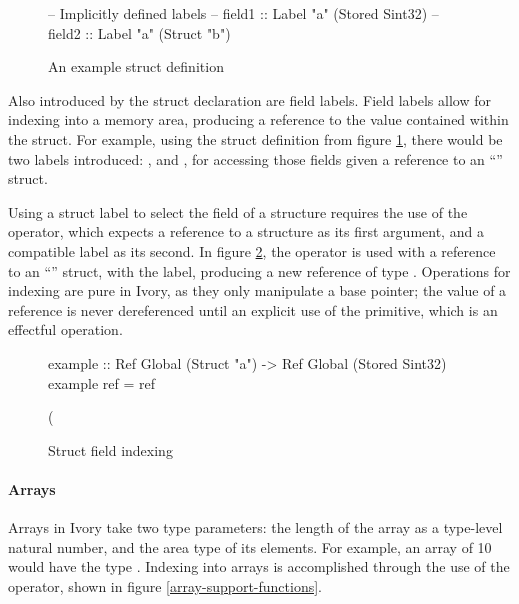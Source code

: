 \begin{figure}[h]
\begin{code}

-- Implicitly defined labels
-- field1 :: Label "a" (Stored Sint32)
-- field2 :: Label "a" (Struct "b")
\end{code}
\caption{An example struct definition}
\label{example-struct}
\end{figure}

Also introduced by the struct declaration are field labels.  Field labels allow
for indexing into a memory area, producing a reference to the value contained
within the struct.  For example, using the struct definition from figure
\ref{example-struct}, there would be two labels introduced: , and
, for accessing those fields given a reference to an ``''
struct.

Using a struct label to select the field of a structure requires the use of the
\cd{(\mytilde>)} operator, which expects a reference to a structure as its first
argument, and a compatible label as its second.  In figure
\ref{example-struct-label}, the \cd{(\mytilde>)} operator is used with a
reference to an ``'' struct, with the  label, producing a new
reference of type .  Operations for indexing are
pure in Ivory, as they only manipulate a base pointer; the value of a reference
is never dereferenced until an explicit use of the  primitive, which
is an effectful operation.

\begin{figure}[h]
\begin{code}
example :: Ref Global (Struct "a")
        -> Ref Global (Stored Sint32)
example ref = ref %

(%
\end{code}
\caption{Struct field indexing}
\label{example-struct-label}
\end{figure}

\paragraph{Arrays}
Arrays in Ivory take two type parameters: the length of the array as a
type-level natural number, and the area type of its elements.  For example, an
array of 10  would have the type .  Indexing into arrays is accomplished through the use of the \cd{(!)}
operator, shown in figure \ref{array-support-functions}.

